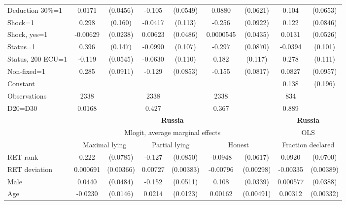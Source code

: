 \begin{tabular}{l|cccccc|cc}
Deduction 30\%=1&   0.0171         & (0.0456)&   -0.105\sym{*}  & (0.0549)&   0.0880         & (0.0621)&    0.104         & (0.0653)\\
Shock=1         &    0.298\sym{*}  &  (0.160)&  -0.0417         &  (0.113)&   -0.256\sym{***}& (0.0922)&    0.122         & (0.0846)\\
Shock, yes=1    & -0.00629         & (0.0238)&  0.00623         & (0.0486)&0.0000545         & (0.0435)&   0.0131         & (0.0526)\\
Status=1        &    0.396\sym{***}&  (0.147)&  -0.0990         &  (0.107)&   -0.297\sym{***}& (0.0870)&  -0.0394         &  (0.101)\\
Status, 200 ECU=1&   -0.119\sym{**} & (0.0545)&  -0.0630         &  (0.110)&    0.182         &  (0.117)&    0.278\sym{**} &  (0.111)\\
Non-fixed=1     &    0.285\sym{***}& (0.0911)&   -0.129         & (0.0853)&   -0.155\sym{*}  & (0.0817)&   0.0827         & (0.0957)\\
Constant        &                  &         &                  &         &                  &         &    0.138         &  (0.196)\\
\hline
Observations    &     2338         &         &     2338         &         &     2338         &         &      834         &         \\
D20=D30         &   0.0168         &         &    0.427         &         &    0.367         &         &    0.889         &         \\
\hline\hline
&\multicolumn{6}{c|}{\bf Russia}&\multicolumn{2}{c}{\bf Russia}\\ &\multicolumn{6}{c|}{Mlogit, average marginal effects }&\multicolumn{2}{c}{OLS}\\
                &\multicolumn{2}{c}{Maximal lying}&\multicolumn{2}{c}{Partial lying}&\multicolumn{2}{c}{Honest}  &\multicolumn{2}{c}{Fraction declared}\\
\hline
RET rank        &    0.222\sym{***}& (0.0785)&   -0.127         & (0.0850)&  -0.0948         & (0.0617)&   0.0920         & (0.0700)\\
RET deviation   & 0.000691         &(0.00366)&  0.00727\sym{*}  &(0.00383)& -0.00796\sym{***}&(0.00298)& -0.00335         &(0.00389)\\
Male            &   0.0440         & (0.0484)&   -0.152\sym{***}& (0.0511)&    0.108\sym{***}& (0.0339)& 0.000577         & (0.0388)\\
Age             &  -0.0230         & (0.0146)&   0.0214\sym{*}  & (0.0123)&  0.00162         &(0.00491)&  0.00312         &(0.00332)\\

\end{tabular}
